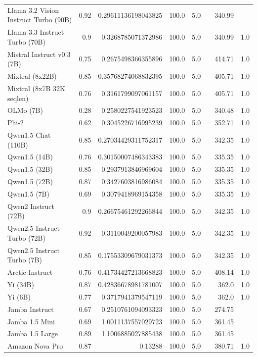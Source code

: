 \begin{table}[htp]
{\begin{tabular}{lrrrrrrr}
Llama 3.2 Vision Instruct Turbo (90B) & 0.92 & 0.29611136198043825 & 100.0 & 5.0 &  & 340.99 &  \\
Llama 3.3 Instruct Turbo (70B) & 0.9 & 0.3268785071372986 & 100.0 & 5.0 &  & 340.99 & 1.0 \\
Mistral Instruct v0.3 (7B) & 0.75 & 0.2675498366355896 & 100.0 & 5.0 &  & 414.71 & 1.0 \\
Mixtral (8x22B) & 0.85 & 0.35768274068832395 & 100.0 & 5.0 &  & 405.71 & 1.0 \\
Mixtral (8x7B 32K seqlen) & 0.76 & 0.3161799097061157 & 100.0 & 5.0 &  & 405.71 & 1.0 \\
OLMo (7B) & 0.28 & 0.2580227541923523 & 100.0 & 5.0 &  & 340.48 & 1.0 \\
Phi-2 & 0.62 & 0.3045226716995239 & 100.0 & 5.0 &  & 352.71 & 1.0 \\
Qwen1.5 Chat (110B) & 0.85 & 0.27034429311752317 & 100.0 & 5.0 &  & 342.35 & 1.0 \\
Qwen1.5 (14B) & 0.76 & 0.30150007486343383 & 100.0 & 5.0 &  & 335.35 & 1.0 \\
Qwen1.5 (32B) & 0.85 & 0.2937913846969604 & 100.0 & 5.0 &  & 335.35 & 1.0 \\
Qwen1.5 (72B) & 0.87 & 0.3427603816986084 & 100.0 & 5.0 &  & 335.35 & 1.0 \\
Qwen1.5 (7B) & 0.69 & 0.3079418969154358 & 100.0 & 5.0 &  & 335.35 & 1.0 \\
Qwen2 Instruct (72B) & 0.9 & 0.26675461292266844 & 100.0 & 5.0 &  & 342.35 & 1.0 \\
Qwen2.5 Instruct Turbo (72B) & 0.92 & 0.3110049200057983 & 100.0 & 5.0 &  & 342.35 & 1.0 \\
Qwen2.5 Instruct Turbo (7B) & 0.85 & 0.17553309679031373 & 100.0 & 5.0 &  & 342.35 & 1.0 \\
Arctic Instruct & 0.76 & 0.41734427213668823 & 100.0 & 5.0 &  & 408.14 & 1.0 \\
Yi (34B) & 0.87 & 0.42836678981781007 & 100.0 & 5.0 &  & 362.0 & 1.0 \\
Yi (6B) & 0.77 & 0.3717941379547119 & 100.0 & 5.0 &  & 362.0 & 1.0 \\
Jamba Instruct & 0.67 & 0.2510761094093323 & 100.0 & 5.0 &  & 274.75 &  \\
Jamba 1.5 Mini & 0.69 & 1.0011137557029723 & 100.0 & 5.0 &  & 361.45 &  \\
Jamba 1.5 Large & 0.89 & 1.1006885027885438 & 100.0 & 5.0 &  & 361.45 &  \\
Amazon Nova Pro & 0.87 & 0.13288 & 100.0 & 5.0 &  & 380.71 & 1.0 \\

\end{tabular}}
\end{table}
